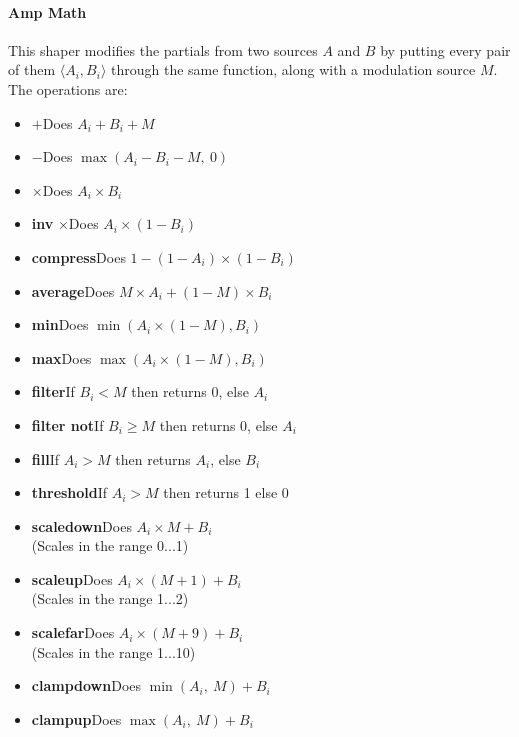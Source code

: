 \documentclass{article}
\begin{document}
\paragraph{Amp Math}  This shaper modifies the partials from two sources \(A\) and \(B\) by putting every pair of them \(\langle A_i, B_i\rangle\) through the same function, along with a modulation source \(M\).  The operations are:

{
\small
\begin{multicols}{2}
\begin{flushleft}
\begin{itemize}
\item \(\boldsymbol{+}\)\quad Does \(A_i + B_i + M\)
\item \(\boldsymbol -\)\quad Does \(\max(A_i - B_i - M,\ 0)\)
\item \(\boldsymbol \times\)\quad Does \(A_i \times B_i\)
\item {\bf inv} \(\boldsymbol \times\)\quad Does \(A_i \times (1 - B_i)\)
\item {\bf compress}\quad Does \(1 - (1 - A_i) \times (1 - B_i)\)
\item {\bf average}\quad Does \(M \times A_i + (1 - M) \times B_i\)
\item {\bf min}\quad Does \(\min(A_i \times (1 - M), B_i)\)
\item {\bf max}\quad Does \(\max(A_i \times (1 - M), B_i)\)
\item {\bf filter}\quad If \(B_i < M\) then returns 0, else \(A_i\)
\item {\bf filter not}\quad  If \(B_i \geq M\) then returns 0, else \(A_i\)
\item {\bf fill}\quad If \(A_i > M\) then returns \(A_i\), else \(B_i\)
\item {\bf threshold}\quad If \(A_i > M\) then returns 1 else 0
\item {\bf scaledown}\quad Does \(A_i \times M + B_i\)\\(Scales in the range 0...1)
\item {\bf scaleup}\quad Does \(A_i \times (M + 1) + B_i\)\\(Scales in the range 1...2)
\item {\bf scalefar}\quad Does \(A_i \times (M + 9) + B_i\)\\(Scales in the range 1...10)
\item {\bf clampdown}\quad Does \(\min(A_i,\ M) + B_i\)
\item {\bf clampup}\quad Does \(\max(A_i,\ M) + B_i\)
\end{itemize}
\end{flushleft}
\end{multicols}
}
\end{document}
